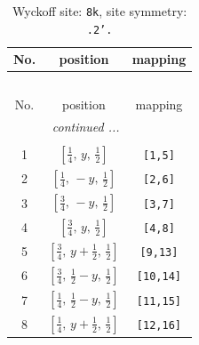 \documentclass[fleqn,8pt]{jsarticle}
\begin{document}
\begin{longtable}{ccc}
\caption{Wyckoff site: {\tt 8k}, site symmetry: {\tt .2'.}}
 \\
 \hline \hline
No. & position & mapping \\ \hline \endfirsthead

\multicolumn{2}{l}{\tablename\ \thetable{}} \\
 \hline \hline
No. & position & mapping \\ \hline \endhead

 \hline \hline
\multicolumn{2}{r}{\footnotesize\it continued ...} \\ \endfoot

 \hline \hline
\multicolumn{2}{r}{} \\ \endlastfoot

1 & $\left[ \frac{1}{4},\, y,\, \frac{1}{2} \right]$ & {\tt [1,5]} \\ \hline
2 & $\left[ \frac{1}{4},\, - y,\, \frac{1}{2} \right]$ & {\tt [2,6]} \\ \hline
3 & $\left[ \frac{3}{4},\, - y,\, \frac{1}{2} \right]$ & {\tt [3,7]} \\ \hline
4 & $\left[ \frac{3}{4},\, y,\, \frac{1}{2} \right]$ & {\tt [4,8]} \\ \hline
5 & $\left[ \frac{3}{4},\, y + \frac{1}{2},\, \frac{1}{2} \right]$ & {\tt [9,13]} \\ \hline
6 & $\left[ \frac{3}{4},\, \frac{1}{2} - y,\, \frac{1}{2} \right]$ & {\tt [10,14]} \\ \hline
7 & $\left[ \frac{1}{4},\, \frac{1}{2} - y,\, \frac{1}{2} \right]$ & {\tt [11,15]} \\ \hline
8 & $\left[ \frac{1}{4},\, y + \frac{1}{2},\, \frac{1}{2} \right]$ & {\tt [12,16]} \\
\end{longtable}
\renewcommand{\arraystretch}{1.2}
\end{document}
